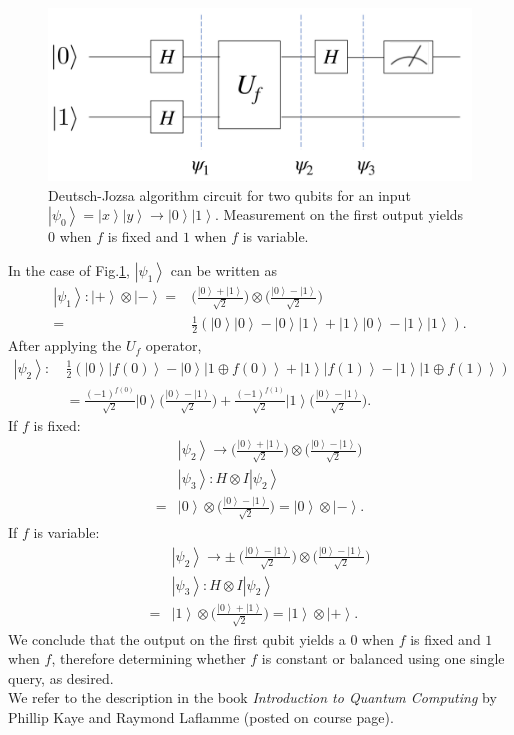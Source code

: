 \documentclass[11pt]{article} %
\newcommand{\ket}[1]{\left|#1\right\rangle}
\begin{document}
\begin{figure}[h!]
    \centering
    \includegraphics[width=.6\textwidth]{Lecture4Figs/DeutschJozsa-diag.png}
    \caption{Deutsch-Jozsa algorithm circuit for two qubits for an input $\ket{\psi_0}=\ket{x}\ket{y} \rightarrow \ket{0}\ket{1}$. Measurement on the first output yields $0$ when $f$ is fixed and $1$ when $f$ is variable.}
    \label{fig:Deutsch-Jozsa}
\end{figure}
In the case of Fig.\ref{fig:Deutsch-Jozsa}, $\ket{\psi_1}$ can be written as
\begin{align}
    \ket{\psi_1}: \ket{+}\otimes\ket{-} 
    =&\Big(\frac{\ket{0}+\ket{1}}{\sqrt{2}}\Big)\otimes \Big(\frac{\ket{0}-\ket{1}}{\sqrt{2}}\Big)\\
    =&\frac{1}{2}(\ket{0}\ket{0}-\ket{0}\ket{1}+\ket{1}\ket{0}-\ket{1}\ket{1}).
\end{align}
After applying the $U_f$ operator,
\begin{align}
    \ket{\psi_2}: \
    &\frac{1}{2}(\ket{0}\ket{f(0)}-\ket{0}\ket{1\oplus f(0)}+\ket{1}\ket{f(1)}-\ket{1}\ket{1\oplus f(1)})\\
    &=\frac{(-1)^{f(0)}}{\sqrt{2}}\ket{0}\Big(\frac{\ket{0}-\ket{1}}{\sqrt{2}} \Big)+\frac{(-1)^{f(1)}}{\sqrt{2}}\ket{1}\Big(\frac{\ket{0}-\ket{1}}{\sqrt{2}} \Big).
\end{align}
If $f$ is fixed: 
\begin{align}
    &\ket{\psi_2} \rightarrow \Big(\frac{\ket{0}+\ket{1}}{\sqrt{2}}\Big)\otimes\Big(\frac{\ket{0}-\ket{1}}{\sqrt{2}}\Big) \\
    & \ket{\psi_3}: H\otimes I\ket{\psi_2}\\
    =& \ket{0}\otimes\Big(\frac{\ket{0}-\ket{1}}{\sqrt{2}} \Big)=\ket{0}\otimes\ket{-}.
\end{align}
If $f$ is variable: 
\begin{align}
    &\ket{\psi_2} \rightarrow \pm \ \Big(\frac{\ket{0}-\ket{1}}{\sqrt{2}}\Big)\otimes\Big(\frac{\ket{0}-\ket{1}}{\sqrt{2}}\Big) \\
    & \ket{\psi_3}: H\otimes I\ket{\psi_2}\\
    =& \ket{1}\otimes\Big(\frac{\ket{0}+\ket{1}}{\sqrt{2}} \Big)=\ket{1}\otimes\ket{+}.
\end{align}
We conclude that the output on the first qubit yields a $0$ when $f$ is fixed and $1$ when $f$, therefore determining whether $f$ is constant or balanced using one single query, as desired.
\\We refer to the description in the book \textit{Introduction to Quantum Computing} by Phillip Kaye and Raymond Laflamme (posted on course page).
\end{document}
